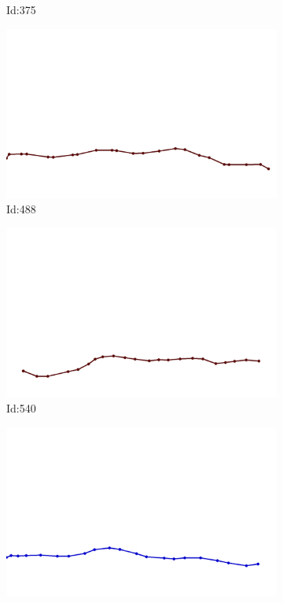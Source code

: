 \documentclass[12pt,twoside]{report}
\begin{document}
\begin{figure}
\begin{subfigure}[b]{0.20\textwidth}
\caption{Id:375}
\end{subfigure}
\begin{subfigure}[b]{0.20\textwidth}
\centering
\includegraphics[width=\textwidth]{../../trajectories/488.png}
\caption{Id:488}
\end{subfigure}
\begin{subfigure}[b]{0.20\textwidth}
\centering
\includegraphics[width=\textwidth]{../../trajectories/540.png}
\caption{Id:540}
\end{subfigure}
\begin{subfigure}[b]{0.20\textwidth}
\centering
\includegraphics[width=\textwidth]{../../trajectories/553.png}

\end{subfigure}
\end{figure}
\end{document}
